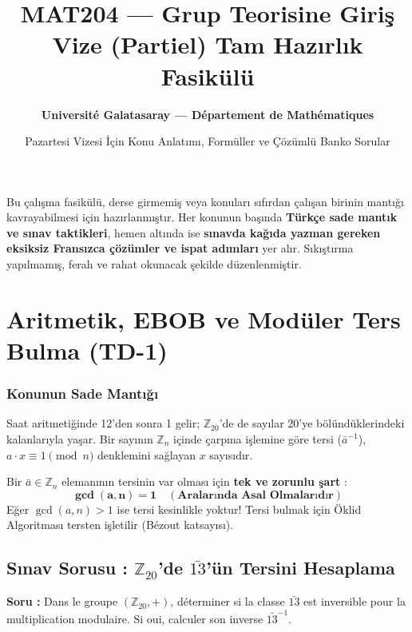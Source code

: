 \documentclass[11pt,a4paper]{article}
\title{\textbf{MAT204 — Grup Teorisine Giriş\\ \Large Vize (Partiel) Tam Hazırlık Fasikülü}}
\author{\textbf{Université Galatasaray — Département de Mathématiques}}
\date{Pazartesi Vizesi İçin Konu Anlatımı, Formüller ve Çözümlü Banko Sorular}
\begin{document}
\shorthandoff{=}
\maketitle

\begin{tcolorbox}[colback=blue!5!white,colframe=blue!75!black,title=\textbf{Bu Fasikül Nasıl Kullanılmalı?}]
Bu çalışma fasikülü, derse girmemiş veya konuları sıfırdan çalışan birinin mantığı kavrayabilmesi için hazırlanmıştır. 
Her konunun başında \textbf{Türkçe sade mantık ve sınav taktikleri}, hemen altında ise \textbf{sınavda kağıda yazman gereken eksiksiz Fransızca çözümler ve ispat adımları} yer alır. 
Sıkıştırma yapılmamış, ferah ve rahat okunacak şekilde düzenlenmiştir.
\end{tcolorbox}

\vspace{0.5cm}

\section{Aritmetik, EBOB ve Modüler Ters Bulma (TD-1)}

\subsubsection*{Konunun Sade Mantığı}
Saat aritmetiğinde 12'den sonra 1 gelir; $\mathbb{Z}_{20}$'de de sayılar 20'ye bölündüklerindeki kalanlarıyla yaşar. 
Bir sayının $\mathbb{Z}_n$ içinde çarpma işlemine göre tersi ($\bar{a}^{-1}$), $a \cdot x \equiv 1 \pmod n$ denklemini sağlayan $x$ sayısıdır.

\begin{tcolorbox}[colback=red!5!white,colframe=red!75!black,title=Altın Kural : Ters Elemanın Varlık Şartı]
Bir $\bar{a} \in \mathbb{Z}_n$ elemanının tersinin var olması için \textbf{tek ve zorunlu şart} :
\[ \mathbf{\gcd(a, n) = 1 \quad (\text{Aralarında Asal Olmalarıdır})} \]
Eğer $\gcd(a, n) > 1$ ise tersi kesinlikle yoktur! Tersi bulmak için Öklid Algoritması tersten işletilir (Bézout katsayısı).
\end{tcolorbox}

\subsection*{Sınav Sorusu : $\mathbb{Z}_{20}$'de $\bar{13}$'ün Tersini Hesaplama}
\textbf{Soru :} Dans le groupe $(\mathbb{Z}_{20}, +)$, déterminer si la classe $\bar{13}$ est inversible pour la multiplication modulaire. Si oui, calculer son inverse $\bar{13}^{-1}$.
\end{document}

